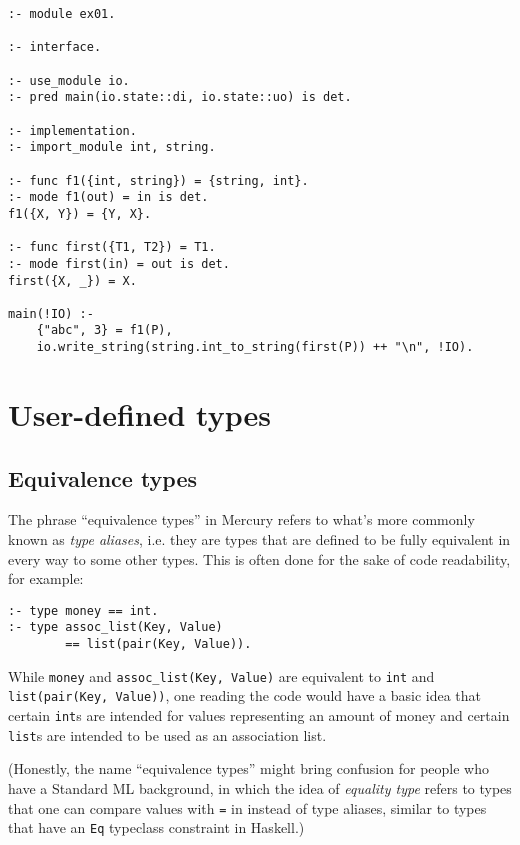 \begin{lstlisting}[language=Mercury]
:- module ex01.

:- interface.

:- use_module io.
:- pred main(io.state::di, io.state::uo) is det.

:- implementation.
:- import_module int, string.

:- func f1({int, string}) = {string, int}.
:- mode f1(out) = in is det.
f1({X, Y}) = {Y, X}.

:- func first({T1, T2}) = T1.
:- mode first(in) = out is det.
first({X, _}) = X.

main(!IO) :-
	{"abc", 3} = f1(P),
	io.write_string(string.int_to_string(first(P)) ++ "\n", !IO).
\end{lstlisting}


\section{User-defined types}

\subsection{Equivalence types}

The phrase ``equivalence types'' in Mercury refers to what's more commonly known as \textit{type aliases}, i.e. they are types that are defined to be fully equivalent in every way to some other types. This is often done for the sake of code readability, for example:

\begin{lstlisting}[language=Mercury]
:- type money == int.
:- type assoc_list(Key, Value)
        == list(pair(Key, Value)).
\end{lstlisting}

While \texttt{money} and \texttt{assoc\_list(Key, Value)} are equivalent to \texttt{int} and \texttt{list(pair(Key, Value))}, one reading the code would have a basic idea that certain \texttt{int}s are intended for values representing an amount of money and certain \texttt{list}s are intended to be used as an association list. 

(Honestly, the name ``equivalence types'' might bring confusion for people who have a Standard ML background, in which the idea of \textit{equality type} refers to types that one can compare values with \texttt{=} in instead of type aliases, similar to types that have an \texttt{Eq} typeclass constraint in Haskell.)

